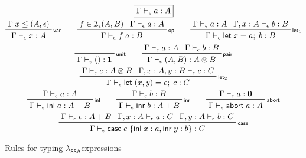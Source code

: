 \documentclass[acmsmall,screen,review]{acmart}
\newcommand{\mc}[1]{\ensuremath{\mathcal{#1}}}
\newcommand{\mb}[1]{\ensuremath{\mathbf{#1}}}
\newcommand{\ms}[1]{\ensuremath{\mathsf{#1}}}
\newcommand{\lto}{:}
\newcommand{\linl}[1]{\ms{inl}\;{#1}}
\newcommand{\linr}[1]{\ms{inr}\;{#1}}
\newcommand{\labort}[1]{\ms{abort}\;{#1}}
\newcommand{\letexpr}[3]{\ensuremath{\ms{let}\;#1 = #2;\;#3}}
\newcommand{\caseexpr}[5]{\ms{case}\;#1\;\{\linl{#2} \lto #3, \linr{#4} \lto #5\}}
\newcommand{\bhyp}[2]{#1 : #2}
\newcommand{\rle}[1]{{\scriptsize\textsf{#1}}}
\newcommand{\hasty}[4]{#1 \vdash_{#2} #3: {#4}}
\newcommand{\isop}[4]{#1 \in \mc{I}_{#4}(#2, #3)}
\newcommand{\isotopessa}{\(\lambda_{\ms{SSA}}\)}
\begin{document}
\begin{figure}
  \begin{gather*}
    \boxed{\hasty{\Gamma}{\epsilon}{a}{A}} \\
    \prftree[r]{\rle{var}}{\Gamma\;x \leq (A, \epsilon)}{\hasty{\Gamma}{\epsilon}{x}{A}} \qquad
    \prftree[r]{\rle{op}}{\isop{f}{A}{B}{\epsilon}}{\hasty{\Gamma}{\epsilon}{a}{A}}
      {\hasty{\Gamma}{\epsilon}{f\;a}{B}} \qquad
    \prftree[r]{\rle{let$_1$}}
      {\hasty{\Gamma}{\epsilon}{a}{A}}
      {\hasty{\Gamma, \bhyp{x}{A}}{\epsilon}{b}{B}}
      {\hasty{\Gamma}{\epsilon}{\letexpr{x}{a}{b}}{B}} \\
    \prftree[r]{\rle{unit}}{\hasty{\Gamma}{\epsilon}{()}{\mb{1}}} \qquad
    \prftree[r]{\rle{pair}}{\hasty{\Gamma}{\epsilon}{a}{A}}{\hasty{\Gamma}{\epsilon}{b}{B}}
      {\hasty{\Gamma}{\epsilon}{(A, B)}{A \otimes B}} \\
    \prftree[r]{\rle{let$_2$}}
      {\hasty{\Gamma}{\epsilon}{e}{A \otimes B}}
      {\hasty{\Gamma, \bhyp{x}{A}, \bhyp{y}{B}}{\epsilon}{c}{C}}
      {\hasty{\Gamma}{\epsilon}{\letexpr{(x, y)}{e}{c}}{C}} \\
    \prftree[r]{\rle{inl}}{\hasty{\Gamma}{\epsilon}{a}{A}}
      {\hasty{\Gamma}{\epsilon}{\linl{a}}{A + B}} \qquad
    \prftree[r]{\rle{inr}}{\hasty{\Gamma}{\epsilon}{b}{B}}
      {\hasty{\Gamma}{\epsilon}{\linr{b}}{A + B}} \qquad
    \prftree[r]{\rle{abort}}{\hasty{\Gamma}{\epsilon}{a}{\mb{0}}}
      {\hasty{\Gamma}{\epsilon}{\labort{a}}{A}} \\
    \prftree[r]{\rle{case}}
      {\hasty{\Gamma}{\epsilon}{e}{A + B}}
      {\hasty{\Gamma, \bhyp{x}{A}}{\epsilon}{a}{C}}
      {\hasty{\Gamma, \bhyp{y}{A}}{\epsilon}{b}{C}}
      {\hasty{\Gamma}{\epsilon}{\caseexpr{e}{x}{a}{y}{b}}{C}}
  \end{gather*}
  \caption{Rules for typing \isotopessa expressions}
  \Description{}
  \label{fig:ssa-expr-rules}
\end{figure}
\end{document}
